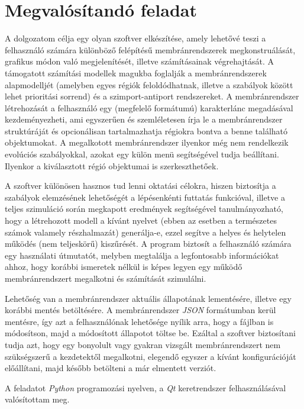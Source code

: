 \section{Megvalósítandó feladat}

A dolgozatom célja egy olyan szoftver elkészítése, amely lehetővé teszi a felhasználó számára különböző felépítésű membránrendszerek megkonstruálását, grafikus módon való megjelenítését, illetve számításainak végrehajtását. A támogatott számítási modellek magukba foglalják a membránrendszerek alapmodelljét (amelyben egyes régiók feloldódhatnak, illetve a szabályok között lehet prioritási sorrend) és a szimport-antiport rendszereket.
A membránrendszer létrehozását a felhasználó egy (megfelelő formátumú) karakterlánc megadásával kezdeményezheti, ami egyszerűen és szemléletesen írja le a membránrendszer struktúráját és opcionálisan tartalmazhatja régiokra bontva a benne található objektumokat. A megalkotott membránrendszer ilyenkor még nem rendelkezik evolúciós szabályokkal, azokat egy külön menü segítségével tudja beállítani. Ilyenkor a kiválasztott régió objektumai is szerkeszthetőek.

A szoftver különösen hasznos tud lenni oktatási célokra, hiszen biztosítja a szabályok elemzésének lehetőségét a lépésenkénti futtatás funkcióval, illetve a teljes szimuláció során megkapott eredmények segítségével tanulmányozható, hogy a létrehozott modell a kívánt nyelvet (ebben az esetben a természetes számok valamely részhalmazát) generálja-e, ezzel segítve a helyes és helytelen működés (nem teljeskörű) kiszűrését.
A program biztosít a felhasználó számára egy használati útmutatót, melyben megtalálja a legfontosabb információkat ahhoz, hogy korábbi ismeretek nélkül is képes legyen egy működő membránrendszert megalkotni és számítását szimulálni.

Lehetőség van a membránrendszer aktuális állapotának lementésére, illetve egy korábbi mentés betöltésére. A membránrendszer \textit{JSON} formátumban kerül mentésre, így azt a felhasználónak lehetősége nyílik arra, hogy a fájlban is módosítson, majd a módosított állapotot töltse be. Ezáltal a szoftver biztosítani tudja azt, hogy egy bonyolult vagy gyakran vizsgált membránrendszert nem szükségszerű a kezdetektől megalkotni, elegendő egyszer a kívánt konfigurációját előállítani, majd később betölteni a már elmentett verziót.

A feladatot \textit{Python} programozási nyelven, a \textit{Qt} keretrendszer felhasználásával valósítottam meg.